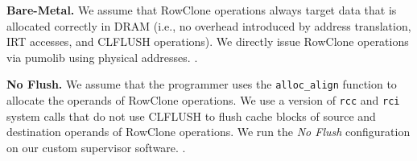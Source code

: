 \noindent
\textbf{Bare-Metal.} We assume that RowClone operations always target data that is allocated correctly in DRAM (i.e.,  no overhead introduced by address translation, IRT accesses, and CLFLUSH operations). We directly issue RowClone operations via pumolib using physical addresses. .

\noindent
\textbf{No Flush.} We assume that the programmer uses the \texttt{alloc\_align} function to allocate the operands of RowClone operations. We use %
{a} version of \texttt{rcc} and \texttt{rci} system calls that do not use CLFLUSH to flush cache blocks of source and destination operands of RowClone operations. We run the \emph{No Flush} configuration on our custom supervisor software. .


